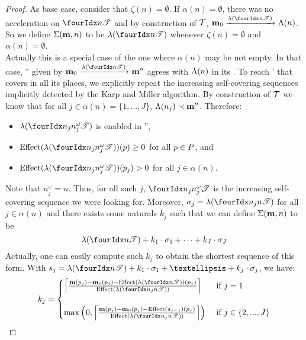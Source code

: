 \begin{proof}
  As base case, consider that $\zeta(n) = \emptyset$.
  If $\alpha(n) = \emptyset$, there was no acceleration on $\treepath{n}$ and by construction of $\mathcal{T}$, $\mari \fire{\lambda(\treepath{n})} \lab{n}$.
  So we define $\Sigma(\mathbf{m}, n)$ to be $\lambda(\treepath{n})$ whenever $\zeta(n) = \emptyset$ and $\alpha(n) = \emptyset$.\\
  Actually this is a special case of the one where $\alpha(n)$ may be not empty.
  In that case, \mar'' given by $\mari \fire{\lambda(\treepath{n})} \mar''$ agrees with $\operatorname{\Lambda}(n)$ in its \noplaces.
  To reach \mar' that covers \mar in all its places, we explicitly repeat the increasing self-covering sequences implicitly detected by the Karp and Miller algorithm.
  By construction of $\mathcal{T}$ we know that for all $j \in \alpha(n) = \{1, ..., J\}$, $\operatorname{\Lambda}(n_j) \prec \mathbf{m}''$.
  Therefore:
  \begin{itemize}
    \item $\lambda(\treepath[n_j]{n^\omega_j})$ is enabled in \mar'',
    \item $\effect{\lambda(\treepath[n_j]{n^\omega_j})}(p) \geq 0$ for all $p \in P$, and
    \item $\effect{\lambda(\treepath[n_j]{n^\omega_j})}(p_j) > 0$ for all $j \in \alpha(n)$.
  \end{itemize}
  Note that $n^\omega_j = n$.
  Thus, for all such $j$, $\treepath[n_j]{n^\omega_j}$ is the increasing self-covering sequence we were looking for.
  Moreover, %
  $\seqt_j = \lambda(\treepath[n_j]{n})$ for all $j \in \alpha(n)$
  and
  there exists some naturals $k_j$ such that we can define $\Sigma(\mathbf{m}, n)$ to be
  \[ \lambda(\treepath{n}) + k_1 \cdot \seqt_1 + \dots + k_J \cdot \seqt_J \] 
  Actually, one can easily compute such $k_j$ to obtain the shortest sequence of this form.
  With $s_j = \lambda(\treepath{n}) + k_1 \cdot \seqt_1 + … + k_j \cdot \seqt_j$, we have:
  \[
    k_j =
    \begin{cases}
      \left\lceil
        \frac{\mar(p_j) - \mari(p_j) - \effect{\lambda(\treepath{n})}(p_j)}
            {\effect{\lambda(\treepath[n_j]{n})}}
      \right\rceil
      &\text{ if } j = 1\\
      \\
      \max\left(0,
        \left\lceil
          \frac{\mar(p_j) - \mari(p_j) - \effect{s_{j-1}}(p_j)}
              {\effect{\lambda(\treepath[n_j]{n})}}
        \right\rceil
      \right)
      &\text{ if } j \in \{2, ..., J\}
    \end{cases}
  \]


\end{proof}
